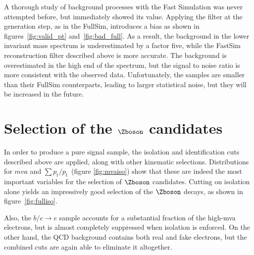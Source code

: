      A thorough study of background processes with the Fast Simulation was never attempted before, but immediately showed its value. Applying the filter at the generation step, as in the FullSim, introduces a bias as shown in figures~\ref{fig:valid_pt} and~\ref{fig:bad_full}. As a result, the background in the lower invariant mass spectrum is underestimated by a factor five, while the FastSim reconstruction filter described above is more accurate.  The background is overestimated in the high end of the spectrum, but the signal to noise ratio is more consistent with the observed data. Unfortunately, the samples are smaller than their FullSim counterparts, leading to larger statistical noise, but they will be increased in the future.
     \section{Selection of the $\Zboson$ candidates}
     In order to produce a pure signal sample, the isolation and identification cuts described above are applied, along with other kinematic selections. Distributions for $mva$ and $\sum p_t / p_t$~(figure \ref{fig:mvaiso}) show that these are indeed the most important variables for the selection of $\Zboson$ candidates. Cutting on isolation alone yields an impressively good selection of the $\Zboson$ decays, as shown in figure~\ref{fig:fulliso}.
\begin{table}[hbp]
    
\end{table}
     Also, the $b/c \rightarrow e$ sample accounts for a substantial fraction of the high-mva electrons, but is almost completely suppressed when isolation is enforced. On the other hand, the QCD background contains both real and fake electrons, but the combined cuts are again able to eliminate it altogether.
     
